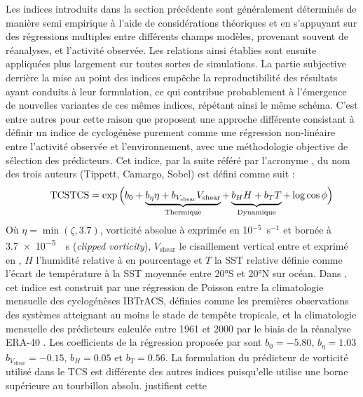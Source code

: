 \documentclass[../main.tex]{subfiles}
\begin{document}
Les indices introduits dans la section précédente sont généralement déterminés de manière semi empirique à l'aide de considérations théoriques et en s'appuyant
sur des régressions multiples entre différents champs modèles, provenant souvent de réanalyses, et l'activité observée. Les relations ainsi établies sont
ensuite appliquées plus largement sur toutes sortes de simulations. La partie subjective derrière la mise au point des indices empêche la reproductibilité des
résultats ayant conduits à leur formulation, ce qui contribue probablement à l'émergence de nouvelles variantes de ces mêmes indices, répétant ainsi le même
schéma. C'est entre autres pour cette raison que \textcite{tippett_poisson_2011} proposent une approche différente consistant à définir un indice de
cyclogénèse purement comme une régression non-linéaire entre l'activité observée et l'environnement, avec une méthodologie objective de sélection des
prédicteurs. Cet indice, par la suite référé par l'acronyme , du nom des trois auteurs (Tippett, Camargo, Sobel) est
défini comme suit :
%
\begin{equation*}
    \tag*{TCS}
    \mathrm{TCS} = \exp \Big( b_0 + \underbrace{b_\eta \eta + b_{V_{\mathrm{shear}}} V_{\mathrm{shear}}}_{\mathrm{Thermique}} + \underbrace{\vphantom{b_\eta}b_H H + b_T
    T}_{\mathrm{Dynamique}} + \log \cos \phi \Big)
\end{equation*}
%
Où $\eta = \min (\zeta, \num{3.7})$, vorticité absolue à  exprimée en 10$^{-5}$~s$^{-1}$ et bornée à \SI{3.7e-5}{\per\second} (\textit{clipped
vorticity}), $V_{\mathrm{shear}}$ le cisaillement vertical entre  et  exprimé en \ms{}, $H$ l'humidité relative à  en pourcentage et
$T$ la SST relative définie comme l'écart de température à la SST moyennée entre \ang{20}S et \ang{20}N sur océan. Dans \textcite{tippett_poisson_2011}, cet
indice est construit par une régression de Poisson entre la climatologie mensuelle des cyclogénèses IBTrACS, définies comme les premières observations des
systèmes atteignant au moins le stade de tempête tropicale, et la climatologie mensuelle des prédicteurs calculée entre \num{1961} et \num{2000} par le biais de
la réanalyse ERA-40 \parencite{uppala_era40_2005}. Les coefficients de la régression proposée par \citeauthor{tippett_poisson_2011} sont $b_0 = \num{-5.80}$,
$b_{\eta} = \num{1.03}$ $b_{V_{\mathrm{shear}}} = \num{-0.15}$, $b_H = \num{0.05}$ et $b_T = \num{0.56}$. La formulation du prédicteur de vorticité utilisé dans
le TCS est différente des autres indices puisqu'elle utilise une borne supérieure au tourbillon absolu. \textcite{tippett_poisson_2011} justifient cette
\end{document}
